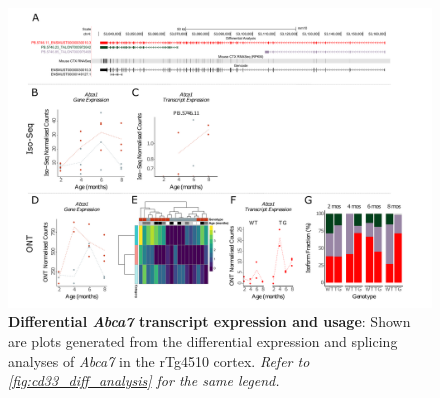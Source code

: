 \begin{landscape}
	\begin{figure}[htp]
		\begin{center}
			\includegraphics[page=2,trim={0 0.5cm 0 1.5cm},scale =0.85]{Figures/TargetGene_DifferentialAnalysis.pdf}
		\end{center}
		\captionsetup{width=1.5\textwidth}
		\caption[Differential \textit{Abca7} transcript expression and usage]%
		{\textbf{Differential \textit{Abca7} transcript expression and usage}: Shown are plots generated from the differential expression and splicing analyses of \textit{Abca7} in the rTg4510 cortex. \textit{Refer to \cref{fig:cd33_diff_analysis} for the same legend.}}   
		\label{fig:abca7_diff_analysis}
	\end{figure}
\end{landscape}

